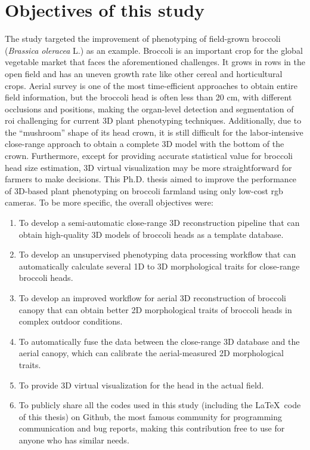 
\section{Objectives of this study}

The study targeted the improvement of phenotyping of field-grown broccoli (\textit{Brassica oleracea} L.) as an example. Broccoli is an important crop for the global vegetable market that faces the aforementioned challenges. It grows in rows in the open field and has an uneven growth rate like other cereal and horticultural crops. Aerial survey is one of the most time-efficient approaches to obtain entire field information, but the broccoli head is often less than 20 cm, with different occlusions and positions, making the organ-level detection and segmentation of \gls{roi} challenging for current 3D plant phenotyping techniques. Additionally, due to the ``mushroom'' shape of its head crown, it is still difficult for the labor-intensive close-range approach to obtain a complete 3D model with the bottom of the crown. Furthermore, except for providing accurate statistical value for broccoli head size estimation, 3D virtual visualization may be more straightforward for farmers to make decisions. This Ph.D. thesis aimed to improve the performance of 3D-based plant phenotyping on broccoli farmland using only low-cost \gls{rgb} cameras. To be more specific, the overall objectives were:

\begin{enumerate}
    \item To develop a semi-automatic close-range 3D reconstruction pipeline that can obtain high-quality 3D models of broccoli heads as a template database.
    \item To develop an unsupervised phenotyping data processing workflow that can automatically calculate several 1D to 3D morphological traits for close-range broccoli heads.
    \item To develop an improved workflow for aerial 3D reconstruction of broccoli canopy that can obtain better 2D morphological traits of broccoli heads in complex outdoor conditions.
    \item To automatically fuse the data between the close-range 3D database and the aerial canopy, which can calibrate the aerial-measured 2D morphological traits.
    \item To provide 3D virtual visualization for the head in the actual field.
    \item To publicly share all the codes used in this study (including the \LaTeX~code of this thesis) on Github, the most famous community for programming communication and bug reports, making this contribution free to use for anyone who has similar needs.
\end{enumerate}


